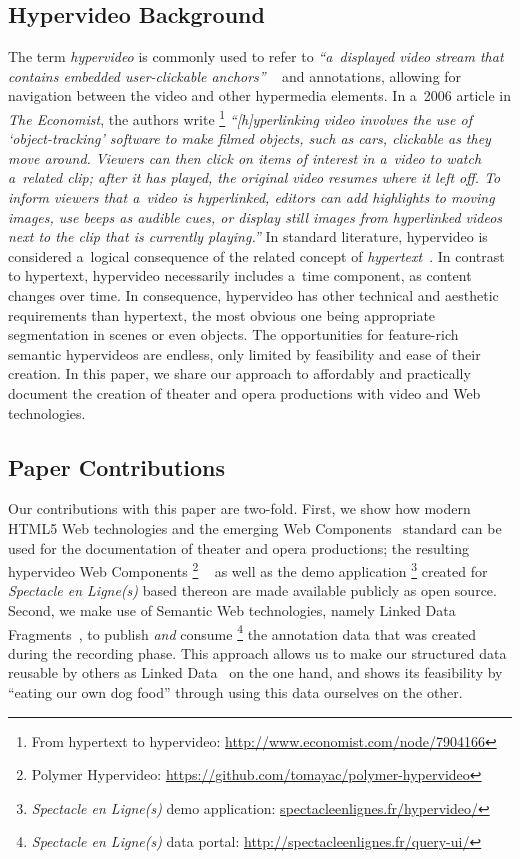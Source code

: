 \documentclass[runningheads,a4paper]{llncs}
\begin{document}
\subsection{Hypervideo Background}

The term \emph{hypervideo} is commonly used to refer to
\textit{``a~displayed video stream that contains embedded user-clickable anchors''}%
~\cite{sawhney1996hypercafe,smith2002extensible}
and annotations, allowing for navigation between the video and other hypermedia elements.
In a~2006 article in \emph{The Economist}, the authors write%
\footnote{From hypertext to hypervideo: \url{http://www.economist.com/node/7904166}} 
\textit{``[h]yperlinking video involves the use of `object-tracking' software
to make filmed objects, such as cars, clickable as they move around.
Viewers can then click on items of interest in a~video
to watch a~related clip; after it has played,
the original video resumes where it left off.
To inform viewers that a~video is hyperlinked,
editors can add highlights to moving images, use beeps as audible cues,
or display still images from hyperlinked videos
next to the clip that is currently playing.''}
In standard literature, hypervideo is considered a~logical consequence
of the related concept of \emph{hypertext}~\cite{bernerslee1990hypertext}.
In contrast to hypertext, hypervideo necessarily includes a~time component,
as content changes over time.
In consequence, hypervideo has other technical and aesthetic requirements
than hypertext, the most obvious one being appropriate segmentation in scenes
or even objects.
The opportunities for feature-rich semantic hypervideos are endless,
only limited by feasibility and ease of their creation.
In this paper, we share our approach to affordably and practically document
the creation of theater and opera productions with video and Web technologies.

\subsection{Paper Contributions}

Our contributions with this paper are two-fold.
First, we show how modern HTML5 Web technologies
and the emerging Web Components~\cite{cooney2013webcomponents} standard
can be used for the documentation of theater and opera productions;
the resulting hypervideo Web Components%
\footnote{Polymer Hypervideo: \url{https://github.com/tomayac/polymer-hypervideo}}%
~\cite{steiner2014hypervideo} as well as the demo application%
\footnote{\emph{Spectacle en Ligne(s)} demo application: \url{spectacleenlignes.fr/hypervideo/}}
created for \emph{Spectacle en Ligne(s)} based thereon
are made available publicly as open source.
Second, we make use of Semantic Web technologies, namely Linked Data Fragments~\cite{verborgh2014ldf},
to publish \emph{and} consume%
\footnote{\emph{Spectacle en Ligne(s)} data portal: \url{http://spectacleenlignes.fr/query-ui/}}
the annotation data that was created during the recording phase.
This approach allows us to make our structured data reusable
by others as Linked Data~\cite{bernerslee2006linkeddata} on the one hand,
and shows its feasibility by ``eating our own dog food'' through using this data ourselves on the other.
\end{document}
